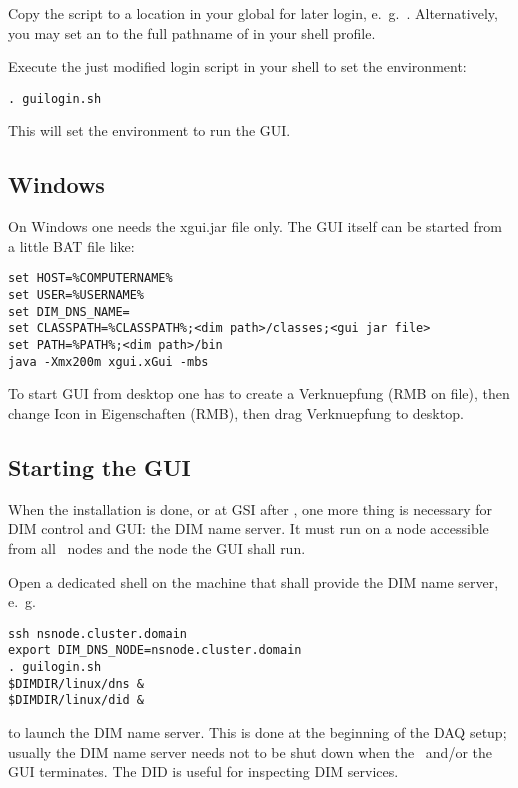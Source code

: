 \item Copy the script to a location in your global  for later login,
e.~g.\ . Alternatively, you
may set an  to the full pathname of  in your shell profile.

\item Execute the just modified login script in your shell to set the environment:  
\begin{small}
\begin{verbatim}
. guilogin.sh
\end{verbatim} 
\end{small}
This will set the environment to run the GUI.
\enum

\subsection{Windows}
On Windows one needs the xgui.jar file only. The GUI itself can be started from a
little BAT file like:
\begin{small}
\begin{verbatim}
set HOST=%COMPUTERNAME% 
set USER=%USERNAME%
set DIM_DNS_NAME=
set CLASSPATH=%CLASSPATH%;<dim path>/classes;<gui jar file>
set PATH=%PATH%;<dim path>/bin
java -Xmx200m xgui.xGui -mbs
\end{verbatim} 
\end{small}
To start GUI from desktop one has to create a Verknuepfung (RMB on file), then change Icon in Eigenschaften (RMB), then drag Verknuepfung to desktop.

\subsection{Starting the GUI}
When the installation is done, or at GSI after ,
one more thing is necessary for DIM control and GUI: the DIM name server.
It must run on a node accessible from all \mbs\ nodes and the node the GUI shall run. 

\bnum
\item Open a dedicated shell on the machine that shall provide the DIM name server,
e.~g.~ 
\begin{small}
\begin{verbatim}
ssh nsnode.cluster.domain
export DIM_DNS_NODE=nsnode.cluster.domain
. guilogin.sh
$DIMDIR/linux/dns &
$DIMDIR/linux/did &
\end{verbatim} 
\end{small}
to launch the DIM name server. This is done  at the beginning of
the DAQ setup; usually the DIM name server needs not to be shut down 
when the \mbs\ and/or the GUI terminates. The DID is useful for inspecting DIM services.

